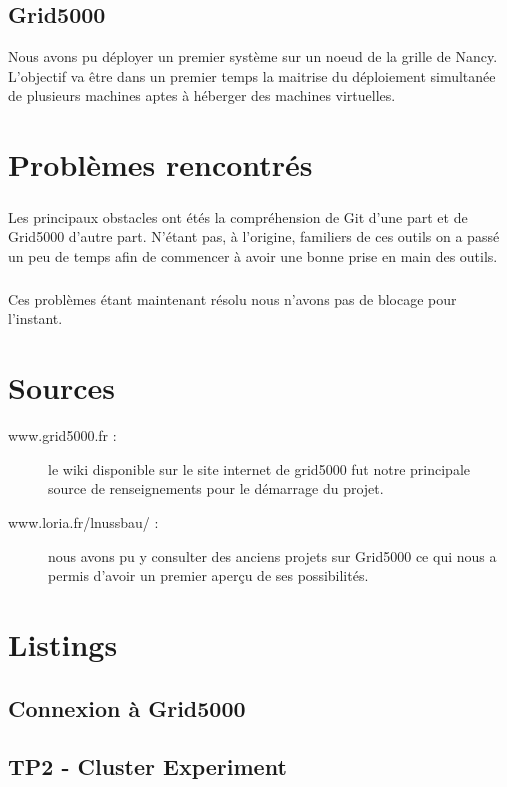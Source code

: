 \documentclass{report}
\begin{document}
\section{Grid5000}
Nous avons pu déployer un premier système sur un noeud de la grille de Nancy.
L'objectif va être dans un premier temps la maitrise du déploiement simultanée de plusieurs machines aptes à héberger des machines virtuelles.
\chapter{Problèmes rencontrés}
\paragraph{}
Les principaux obstacles ont étés la compréhension de Git d'une part et de Grid5000 d'autre part. N'étant pas, à l'origine, familiers de ces outils on a passé un peu de temps afin de commencer à avoir une bonne prise en main des outils.
\paragraph{}
Ces problèmes étant maintenant résolu nous n'avons pas de blocage pour l'instant.
\appendix
\chapter{Sources}
\begin{description}
\item[www.grid5000.fr : ]le wiki disponible sur le site internet de grid5000 fut notre principale source de renseignements pour le démarrage du projet.
\item[www.loria.fr/lnussbau/ : ]nous avons pu y consulter des anciens projets sur Grid5000 ce qui nous a permis d'avoir un premier aperçu de ses possibilités.
\end{description}
\chapter{Listings}
\section{Connexion à Grid5000}

\section{TP2 - Cluster Experiment}

\end{document}
